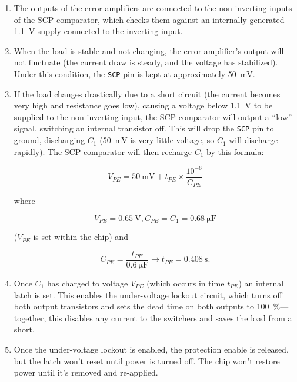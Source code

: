 \documentclass{article}
\newcommand{\chippin}{\texttt}
\begin{document}
\begin{enumerate}
\item The outputs of the error amplifiers are connected to the
  non-inverting inputs of the SCP comparator, which checks them
  against an internally-generated \qty{1.1}{\volt} supply connected to
  the inverting input.
\item When the load is stable and not changing, the error amplifier's
  output will not fluctuate (the current draw is steady, and the
  voltage has stabilized). Under this condition, the \chippin{SCP} pin
  is kept at approximately \qty{50}{\milli\volt}.
\item If the load changes drastically due to a short circuit (the
  current becomes very high and resistance goes low), causing a
  voltage below \qty{1.1}{\volt} to be supplied to the non-inverting
  input, the SCP comparator will output a ``low'' signal, switching an
  internal transistor off. This will drop the \chippin{SCP} pin to
  ground, discharging $C_1$ (\qty{50}{\milli\volt} is very little
  voltage, so $C_1$ will discharge rapidly). The SCP comparator will
  then recharge $C_1$ by this formula:

\begin{displaymath}
  V_{PE} = \qty{50}{\milli\volt} + t_{PE} \times
  \frac{10^{-6}}{C_{PE}}
\end{displaymath}

\noindent
where

\begin{displaymath}
  V_{PE} = \qty{0.65}{\volt}, C_{PE} = C_1 = \qty{0.68}{\micro\farad}
\end{displaymath}

($V_{PE}$ is set within the chip) and

\begin{displaymath}
  C_{PE} = \frac{t_{PE}}{\qty{0.6}{\micro\farad}}
  \rightarrow{} t_{PE} = \qty{0.408}{\second}.
\end{displaymath}

\item Once $C_1$ has charged to voltage $V_{PE}$ (which occurs in time
  $t_{PE}$) an internal latch is set. This enables the under-voltage
  lockout circuit, which turns off both output transistors and sets
  the dead time on both outputs to \qty{100}{\%}---together, this
  disables any current to the switchers and saves the load from a
  short.
\item Once the under-voltage lockout is enabled, the protection enable
  is released, but the latch won't reset until power is turned
  off. The chip won't restore power until it's removed and re-applied.
\end{enumerate}
\end{document}

